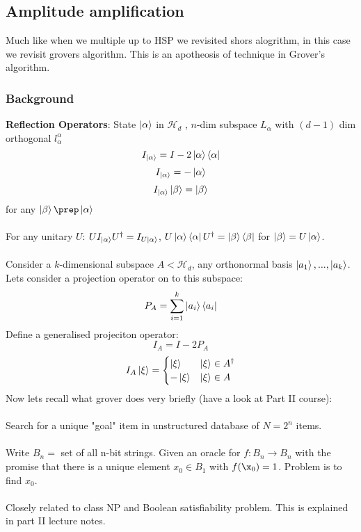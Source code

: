 \documentclass{article}
\begin{document}
{               \subsection{Amplitude amplification}
Much like when we multiple up to HSP we revisited shors alogrithm, in this case we revisit grovers algorithm. This is an apotheosis of technique in Grover's algorithm.
\subsubsection{Background}
\textbf{Reflection Operators}:
State $\ket{\alpha}$ in $\mathcal{H}_{d}$ , $n$-dim subspace $L_{\alpha}$ with $(d-1)$ dim orthogonal $l_{\alpha}^{\alpha}$
$$
I_{\ket{\alpha}} = I - 2 \ket{\alpha} \bra{\alpha}
$$
$$
I_{\ket{\alpha}} = - \ket{\alpha}
$$
$$
I_{\ket{\alpha}} \ket{\beta} = \ket{\beta}
$$
for any $\ket{\beta} \prep \ket{\alpha}$\\\\
For any unitary $U$: $UI_{\ket{\alpha}} U^{\dagger} = I_{U\ket{\alpha}}$, $U \ket{\alpha} \bra{\alpha} U^{\dagger} = \ket{\beta} \bra{\beta}$ for $\ket{\beta} = U\ket{\alpha}$.\\\\
Consider a $k$-dimensional subspace $A < \mathcal{H}_d$, any orthonormal basis $\ket{a_1}, ..., \ket{a_k}$. Lets consider a projection operator on to this subspace:
$$
P_A = \sum_{i=1}^k \ket{a_i} \bra{a_i} 
$$
Define a generalised projeciton operator:
$$
I_A = I - 2 P_A
$$
$$
               I_A \ket{\xi} = \begin{cases} \ket{\xi} & \ket{\xi} \in A^{\dagger}\\
               - \ket{\xi} & \ket{\xi} \in A\end{cases}
$$
Now lets recall what grover does very briefly (have a look at Part II course):\\\\
Search for a unique "goal" item  in unstructured database of $N = 2^n$ items.\\\\
Write $B_n =$ set of all n-bit strings. Given an oracle for $f: B_n \rightarrow B_n$ with the promise that there is a unique element $x_0 \in B_1$ with $f(\x_0) = 1$. Problem is to find $x_0$.\\\\
Closely related to class NP and Boolean satisfiability problem. This is explained in part II lecture notes.
}
\end{document}
